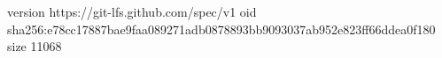 version https://git-lfs.github.com/spec/v1
oid sha256:e78cc17887bae9faa089271adb0878893bb9093037ab952e823ff66ddea0f180
size 11068
